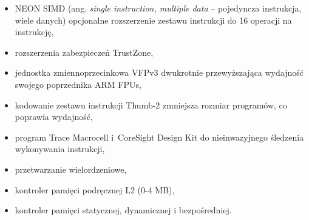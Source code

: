 \begin{itemize}
	\item NEON SIMD (ang. \textit{single instruction, multiple data} -- pojedyncza instrukcja, wiele danych) opcjonalne rozszerzenie zestawu instrukcji do 16 operacji na instrukcję,
	\item rozszerzenia zabezpieczeń TrustZone,
	\item jednostka zmiennoprzecinkowa VFPv3 dwukrotnie przewyższająca wydajność swojego poprzednika ARM FPUs,
	\item kodowanie zestawu instrukcji Thumb-2 zmniejsza rozmiar programów, co poprawia wydajność,
	\item program Trace Macrocell i~CoreSight Design Kit do nieinwazyjnego śledzenia wykonywania instrukcji,
	\item przetwarzanie wielordzeniowe,
	\item kontroler pamięci podręcznej L2 (0-4 MB),
	\item kontroler pamięci statycznej, dynamicznej i bezpośredniej.
\end{itemize}
